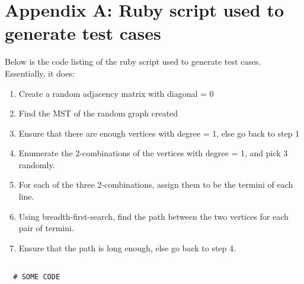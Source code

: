 \documentclass[a4paper,12pt]{article}
\begin{document}
\newpage
\section{Appendix A: Ruby script used to generate test cases}
Below is the code listing of the ruby script used to generate test cases. Essentially, it does:
\begin{enumerate}
	\item Create a random adjacency matrix with diagonal = 0
	\item Find the MST of the random graph created
	\item Ensure that there are enough vertices with degree = 1, else go back to step 1
	\item Enumerate the 2-combinations of the vertices with degree = 1, and pick 3 randomly.
	\item For each of the three 2-combinations, assign them to be the termini of each line.
	\item Using breadth-first-search, find the path between the two vertices for each pair of termini.
	\item Ensure that the path is long enough, else go back to step 4.
\end{enumerate}
\begin{verbatim}

  # SOME CODE

	\end{verbatim}
\end{document}
